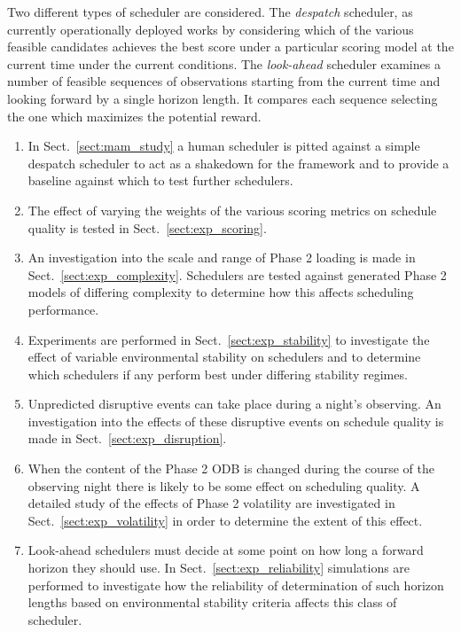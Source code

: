 Two different types of scheduler are considered. The \emph{despatch} scheduler, as currently operationally deployed works by considering which of the various feasible candidates achieves the best score under a particular scoring model at the current time under the current conditions. The \emph{look-ahead} scheduler examines a number of feasible sequences of observations starting from the current time and looking forward by a single horizon length. It compares each sequence selecting the one which maximizes the potential reward.

\begin{enumerate}
\item In Sect.~\ref{sect:mam_study} a human scheduler is pitted against a simple despatch scheduler to act as a shakedown for the framework and to provide a baseline against which to test further schedulers.

\item The effect of varying the weights of the various scoring metrics on schedule quality is tested in Sect.~\ref{sect:exp_scoring}.

\item An investigation into the scale and range of Phase 2 loading is made in Sect.~\ref{sect:exp_complexity}. Schedulers are tested against generated Phase 2 models of differing complexity to determine how this affects scheduling performance.

\item Experiments are performed in Sect.~\ref{sect:exp_stability} to investigate the effect of variable environmental stability on schedulers and to determine which schedulers if any perform best under differing stability regimes.

\item Unpredicted disruptive events can take place during a night's observing. An investigation into the effects of these disruptive events on schedule quality is made in Sect.~\ref{sect:exp_disruption}.

\item When the content of the Phase 2 ODB is changed during the course of the observing night there is likely to be some effect on scheduling quality. A detailed study of the effects of Phase 2 volatility are investigated in Sect.~\ref{sect:exp_volatility} in order to determine the extent of this effect.


\item Look-ahead schedulers must decide at some point on how long a forward horizon they should use. In Sect.~\ref{sect:exp_reliability} simulations are performed to investigate how the reliability of determination of such horizon lengths based on environmental stability criteria affects this class of scheduler.



\end{enumerate}
